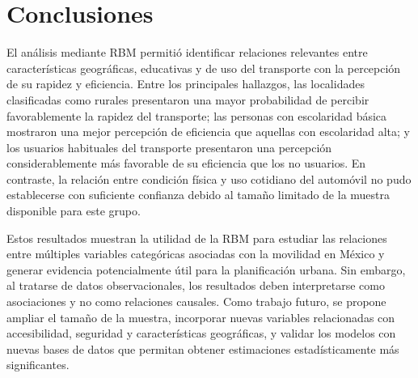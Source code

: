 \documentclass[
  letterpaper,
  DIV=11,
  numbers=noendperiod]{scrartcl}
\begin{document}
\section{Conclusiones}\label{Conclusiones}

El análisis mediante RBM permitió identificar relaciones relevantes 
entre características geográficas, educativas y de uso del transporte con la 
percepción de su rapidez y eficiencia. Entre los principales hallazgos, las localidades 
clasificadas como rurales presentaron una mayor probabilidad de percibir favorablemente 
la rapidez del transporte; las personas con escolaridad básica mostraron una mejor 
percepción de eficiencia que aquellas con escolaridad alta; y los usuarios habituales 
del transporte presentaron una percepción considerablemente más favorable de su 
eficiencia que los no usuarios. En contraste, la relación entre condición física y 
uso cotidiano del automóvil no pudo establecerse con suficiente confianza debido al 
tamaño limitado de la muestra disponible para este grupo.

Estos resultados muestran la utilidad de la RBM para estudiar las relaciones entre 
múltiples variables categóricas asociadas con la 
movilidad en México y generar evidencia potencialmente útil para la planificación 
urbana. Sin embargo, al tratarse de datos observacionales, los resultados deben interpretarse como asociaciones 
y no como relaciones causales. Como trabajo futuro, se propone ampliar el tamaño de la 
muestra, incorporar nuevas variables relacionadas con accesibilidad, seguridad y 
características geográficas, y validar los modelos con nuevas bases de datos que 
permitan obtener estimaciones estadísticamente más significantes.


\printbibliography
\end{document}
